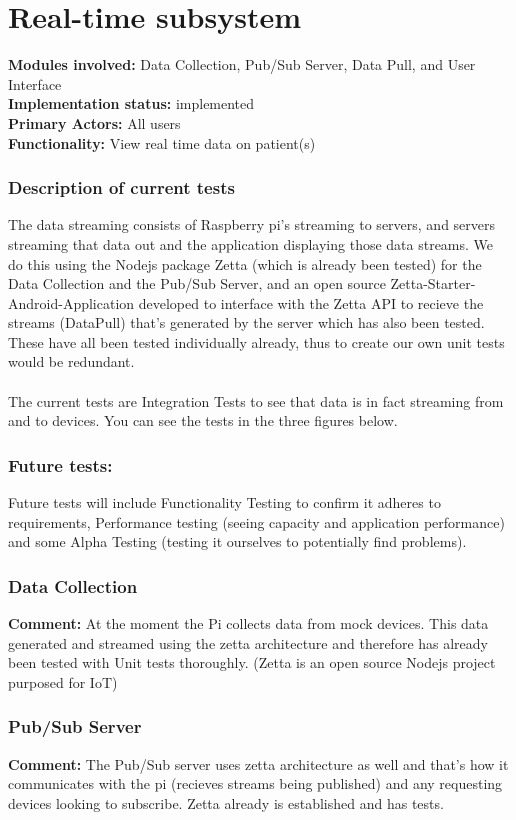 \documentclass[12pt]{article}
\begin{document}
{	\pagebreak

	\section{Real-time subsystem}
	\textbf{Modules involved:} Data Collection,  Pub/Sub Server, Data Pull, and User Interface \\
	\textbf{Implementation status:} implemented \\
	\textbf{Primary Actors:} All users \\
	\textbf{Functionality:} View real time data on patient(s)\\
	\subsubsection{Description of current tests}
	The data streaming consists of Raspberry pi's streaming to servers, and servers streaming that data out and the application displaying those data streams. We do this using the Nodejs package Zetta (which is already been tested) for the Data Collection and the Pub/Sub Server, and an open source Zetta-Starter-Android-Application developed to interface with the Zetta API to recieve the streams (DataPull) that's generated by the server which has also been tested. These have all been tested individually already, thus to create our own unit tests would be redundant. \\ \\ 

	The current tests are Integration Tests to see that data is in fact streaming from and to devices. You can see the tests in the three figures below. 
	\subsubsection{Future tests:}
	Future tests will include Functionality Testing to confirm it adheres to requirements, Performance testing (seeing capacity and application performance) and some Alpha Testing (testing it ourselves to potentially find problems).
	\subsubsection{Data Collection}
	\textbf{Comment:} At the moment the Pi collects data from mock devices. This data generated and streamed using the zetta architecture and therefore has already been tested with Unit tests thoroughly. (Zetta is an open source Nodejs project purposed for IoT)
	\subsubsection{Pub/Sub Server}
	\textbf{Comment:} The Pub/Sub server uses zetta architecture as well and that's how it communicates with the pi (recieves streams being published) and any requesting devices looking to subscribe. Zetta already is established and has tests.
}
\end{document}

